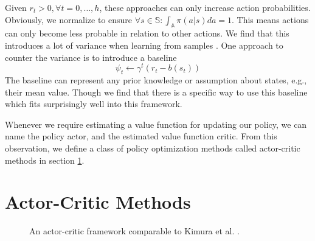Given $r_t > 0, \forall t=0,\dots,h$, these approaches can only increase action probabilities. 
Obviously, we normalize to ensure $\forall s \in \mathbb{S}: \int_\mathbb{A}{\pi(a|s)da} = 1$. 
This means actions can only become less probable in relation to other actions. 
We find that this introduces a lot of variance when learning from samples \cite{Sutton:1999:PGM:3009657.3009806}. 
One approach to counter the variance is to introduce a baseline
\begin{equation}
  \psi_t \leftarrow \gamma^{t} (r_{t} - b(s_t))
\end{equation}
The baseline can represent any prior knowledge or assumption about states, e.g., their mean value. 
Though we find that there is a specific way to use this baseline which fits surprisingly well into this framework.

Whenever we require estimating a value function for updating our policy, we can name the policy actor, and the estimated value function critic. 
From this observation, we define a class of policy optimization methods called actor-critic methods in section \ref{sec:ac}.


\section{Actor-Critic Methods} 
\label{sec:ac}

\begin{figure}
  \caption{An actor-critic framework comparable to Kimura et al.  \cite{Kimura1998AnAO}.} \label{fig:ac}
\end{figure}

